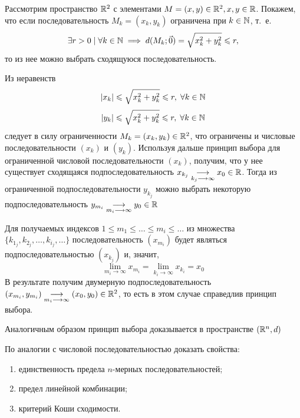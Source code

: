 \documentclass[../../main.tex]{subfiles}
\begin{document}
  \begin{exmp}
    Рассмотрим пространство $\mathbb{R}^2$ с элементами
    $M=(x,y) \in \mathbb{R}^2, x,y \in \mathbb{R}$. 
    Покажем, что если последовательность $M_k=(x_k,y_k)$ ограничена 
    при $k \in \mathbb{N}$, т.~е.
    \[
    \exists r>0 \; | \; \forall k \in \mathbb{N} 
    \implies d(M_k; \vec0)=\sqrt{x^2_k+y^2_k} \leqslant r,
    \]
    то из нее можно выбрать сходящуюся последовательность.
    
    Из неравенств
    \[ 
    |x_k| \leqslant \sqrt{x^2_k+y^2_k}\leqslant r, \; \forall k \in \mathbb{N} 
    \]
    \[ 
    |y_k| \leqslant \sqrt{x^2_k+y^2_k}\leqslant r, \; \forall k \in \mathbb{N} 
    \]
    следует в силу ограниченности $M_k=(x_k,y_k) \in \mathbb{R}^2$, 
    что ограничены и числовые последовательности
    $(x_k)$ и $(y_k)$. 
    Используя дальше принцип выбора для ограниченной 
    числовой последовательности $(x_k)$,
    получим, что у нее существует сходящаяся подпоследовательность
    $x_{k_j}\underset{k_j \longrightarrow \infty}
    {\longrightarrow}x_0 \in \mathbb{R}$.
    Тогда из ограниченной подпоследовательности $y_{k_j}$ 
    можно выбрать некоторую подпоследовательность
    $y_{m_i}\underset{m_i\longrightarrow \infty}
    {\longrightarrow}y_0 \in \mathbb{R}$
    
    Для получаемых индексов $1 \leq m_1 \leq \ldots 
    \leq m_i \leq \ldots $ из множества
    $\{k_{1_j}, k_{2_j}, \dots, k_{i_j}, \dots\}$
    последовательность $ (x_{m_i}) $ будет являться 
    подпоследовательностью $ (x_{k_j}) $ и, значит, 
    \[  \lim_{m_i \to \infty}{x_{m_i}}= 
    \lim_{k_i \to \infty}{x_{k_i}}=  x_0\]
    В результате получим двумерную подпоследовательность 
    $(x_{m_i}, y_{m_i}) \underset{m_i\longrightarrow \infty}
    {\longrightarrow} (x_0, y_0) \in \mathbb{R}^2$,
    то есть в этом случае справедлив принцип выбора.
    
    Аналогичным образом принцип выбора доказывается в пространстве $
    (\mathbb{R}^n, d)$
  \end{exmp}

  \begin{exc}
    По аналогии с числовой последовательностью
    доказать свойства:
    \begin{enumerate}
      \item единственность  предела $n$-мерных последовательностей;
      \item предел линейной комбинации;
      \item критерий Коши сходимости.
    \end{enumerate}
  \end{exc}
\end{document}
